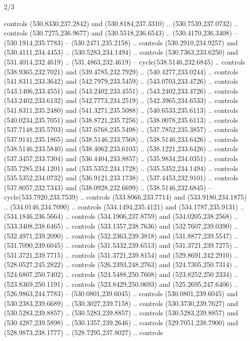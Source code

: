 \begin{flagdescription}{2/3}
\begin{scope}[xshift=0.5\flaglength,yshift=0.5\flagwidth,scale=\flagwidth/495.65]
\begin{scope}[y=0.8pt, x=0.8pt, yscale=-1,shift={(-463.76,-309.78)}]
  controls (530.8330,237.2842) and (530.8184,237.3310) .. (530.7539,237.0732) ..
  controls (530.7275,236.9677) and (530.5518,236.6543) .. (530.4170,236.3408) --
  (530.1914,235.7783) -- (530.2471,235.2158) .. controls (530.2910,234.9257) and
  (530.4111,234.4453) .. (530.5283,234.1494) .. controls (530.7363,233.6250) and
  (531.4014,232.4619) .. (531.4863,232.4619) -- cycle(538.5146,232.6845) ..
  controls (538.9365,232.7021) and (539.4785,232.7929) .. (540.4277,233.0244) ..
  controls (541.8311,233.3642) and (542.7979,233.5459) .. (543.0703,233.4726) ..
  controls (543.1406,233.4551) and (543.2402,233.4551) .. (543.2402,233.4726) ..
  controls (543.2402,233.6132) and (542.7773,234.2519) .. (542.3965,234.6533) ..
  controls (541.8311,235.2480) and (541.3271,235.5088) .. (540.6533,235.6113) ..
  controls (540.0234,235.7051) and (538.8721,235.7256) .. (538.0078,235.6113) ..
  controls (537.7148,235.5703) and (537.6768,235.5498) .. (537.7852,235.3857) ..
  controls (537.9141,235.1865) and (538.5146,233.7568) .. (538.5146,233.6426) ..
  controls (538.5146,233.5840) and (538.4062,233.6103) .. (538.1221,233.6426) ..
  controls (537.3457,233.7304) and (536.4404,233.8857) .. (535.9834,234.0351) ..
  controls (535.7285,234.1201) and (535.5352,234.1728) .. (535.5352,234.1494) ..
  controls (535.5352,234.0732) and (536.9121,233.1738) .. (537.4453,232.9101) ..
  controls (537.8057,232.7343) and (538.0928,232.6699) .. (538.5146,232.6845) --
  cycle(533.7920,233.7539) .. controls (533.8066,233.7714) and
  (533.9180,234.1875) .. (534.0146,234.7090) .. controls (534.1494,235.4121) and
  (534.1787,235.9131) .. (534.1846,236.5664) .. controls (534.1906,237.8759) and
  (534.0205,238.2568) .. (533.3408,238.6465) .. controls (533.1357,238.7636) and
  (532.7607,239.0390) .. (532.4971,239.2090) .. controls (532.2363,239.3818) and
  (531.8877,239.5547) .. (531.7090,239.6045) .. controls (531.5332,239.6513) and
  (531.3721,239.7275) .. (531.3721,239.7715) .. controls (531.3721,239.8154) and
  (529.8691,242.2910) .. (528.0527,245.2822) .. controls (526.2393,248.2763) and
  (524.7305,250.7314) .. (524.6807,250.7402) .. controls (524.5488,250.7608) and
  (523.8252,250.2334) .. (523.8369,250.1191) .. controls (523.8429,250.0693) and
  (525.2695,247.6406) .. (526.9863,244.7783) -- (530.0801,239.6045) .. controls
  (530.0801,239.6045) and (530.2383,239.6689) .. (530.3027,239.7158) .. controls
  (530.3730,239.7627) and (530.5283,239.8857) .. (530.5283,239.8857) .. controls
  (530.5283,239.8857) and (530.4287,239.5898) .. (530.1357,239.2646) .. controls
  (529.7051,238.7900) and (528.9873,238.1777) .. (528.7295,237.8027) .. controls

\end{scope}
\end{scope}
\end{flagdescription}
